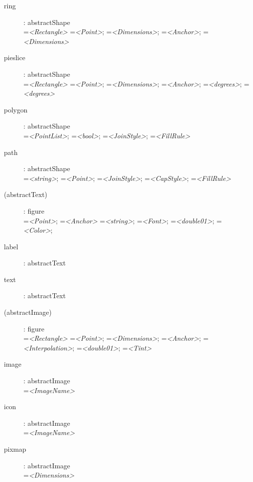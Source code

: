 \begin{description}
\item[ring]: abstractShape \\
    =\textit{<Rectangle>}
    =\textit{<Point>};
    =\textit{<Dimensions>};
    =\textit{<Anchor>};
    =\textit{<Dimensions>}

\item[pieslice]: abstractShape \\
    =\textit{<Rectangle>}
    =\textit{<Point>};
    =\textit{<Dimensions>};
    =\textit{<Anchor>};
    =\textit{<degrees>};
    =\textit{<degrees>}

\item[polygon]: abstractShape \\
    =\textit{<PointList>};
    =\textit{<bool>};
    =\textit{<JoinStyle>};
    =\textit{<FillRule>}

\item[path]: abstractShape \\
    =\textit{<string>};
    =\textit{<Point>};
    =\textit{<JoinStyle>};
    =\textit{<CapStyle>};
    =\textit{<FillRule>}

\item[(abstractText)]: figure \\
    =\textit{<Point>};
    =\textit{<Anchor>}
    =\textit{<string>};
    =\textit{<Font>};
    =\textit{<double01>};
    =\textit{<Color>};

\item[label]: abstractText

\item[text]: abstractText

\item[(abstractImage)]: figure \\
    =\textit{<Rectangle>}
    =\textit{<Point>};
    =\textit{<Dimensions>};
    =\textit{<Anchor>};
    =\textit{<Interpolation>};
    =\textit{<double01>};
    =\textit{<Tint>}

\item[image]: abstractImage \\
    =\textit{<ImageName>}

\item[icon]: abstractImage \\
    =\textit{<ImageName>}

\item[pixmap]: abstractImage \\
    =\textit{<Dimensions>}

\end{description}






















